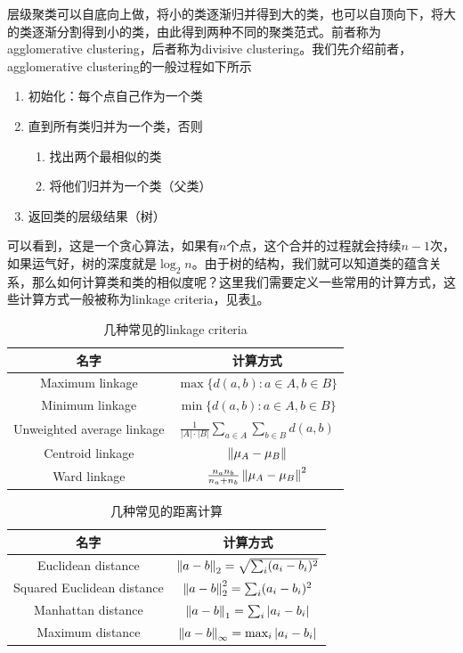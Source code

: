 层级聚类可以自底向上做，将小的类逐渐归并得到大的类，也可以自顶向下，将大的类逐渐分割得到小的类，由此得到两种不同的聚类范式。前者称为agglomerative clustering，后者称为divisive clustering。我们先介绍前者，agglomerative clustering的一般过程如下所示
\begin{enumerate}
    \item 初始化：每个点自己作为一个类
    \item 直到所有类归并为一个类，否则
    \begin{enumerate}
        \item 找出两个最相似的类
        \item 将他们归并为一个类（父类）
    \end{enumerate}
    \item 返回类的层级结果（树）
\end{enumerate}
可以看到，这是一个贪心算法，如果有$n$个点，这个合并的过程就会持续$n-1$次，如果运气好，树的深度就是$\log_2 n$。由于树的结构，我们就可以知道类的蕴含关系，那么如何计算类和类的相似度呢？这里我们需要定义一些常用的计算方式，这些计算方式一般被称为linkage criteria，见表\ref{tab: linkage}。

\begin{table}[h]
\caption{几种常见的linkage criteria}
\begin{tabular}{cc}
\toprule
名字 & 计算方式 \\
\midrule
Maximum linkage & $\max{\{d(a,b): a \in A, b \in B\}}$ \\ 
Minimum linkage & $\min{\{d(a,b): a \in A, b \in B\}}$ \\ 
Unweighted average linkage & $\frac{1}{|A|\cdot |B|} \sum_{a \in A}\sum_{b \in B} d(a,b)$ \\
Centroid linkage & $\left\lVert\mu_A-\mu_B\right\rVert$ \\
Ward linkage & $\frac{n_a n_b}{n_a + n_b} \left\lVert\mu_A-\mu_B\right\rVert^2$ \\
\bottomrule
\end{tabular}
\label{tab: linkage}
\end{table}
\begin{table}[h]
\caption{几种常见的距离计算}
\begin{tabular}{cc}
\toprule
名字 & 计算方式 \\
\midrule
Euclidean distance & $\left\lVert a-b\right\rVert_2 = \sqrt{\sum_i (a_i - b_i)^2}$ \\ 
Squared Euclidean distance & $\left\lVert a-b\right\rVert_{2}^2 = \sum_i (a_i - b_i)^2$ \\ 
Manhattan distance & $\left\lVert a-b\right\rVert_1 = \sum_i |a_i - b_i|$ \\
Maximum distance & $\left\lVert a-b\right\rVert_\infty = \max_i |a_i - b_i|$ \\
\bottomrule
\end{tabular}
\label{tab: distance}
\end{table}

